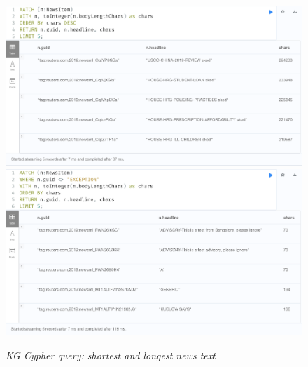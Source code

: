 \documentclass[11pt]{article}
\begin{document}
  \begin{figure}
    \includegraphics[scale=0.2]{01-longest-items}
    \includegraphics[scale=0.2]{01-shortest-items}
    \caption{\textit{KG Cypher query: shortest and longest news text}}
  \end{figure}
\end{document}
